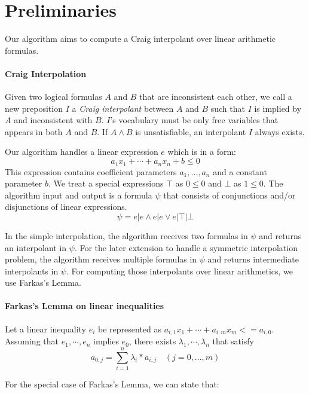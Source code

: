 

\section{Preliminaries}

Our algorithm aims to compute a Craig interpolant over linear
arithmetic formulas.


\paragraph{Craig Interpolation}
Given two logical formulas $A$ and $B$ that are inconsistent each
other, we call a new preposition $I$ a \emph{Craig interpolant}
\cite{journals/jsyml/Craig57} between $A$ and $B$ such that $I$ is
implied by $A$ and inconsistent with $B$.  $I$'s vocabulary must be
only free variables that appears in both $A$ and $B$.  If $A \wedge B$
is unsatisfiable, an interpolant $I$ always exists.

Our algorithm handles a linear expression $e$ which is in a form:
\[ a_1 x_1 + \cdots + a_n x_n + b \leq 0 \]
This expression contains coefficient parameters $a_1, \ldots, a_n$ and
a constant parameter $b$.  We treat a special expressions $\top$ as $0
\leq 0$ and $\bot$ as $1 \leq 0$.  The algorithm input and output is a
formula $\psi$ that consists of conjunctions and/or disjunctions of
linear expressions.
\[ \psi = e | e \wedge e | e \vee e | \top | \bot \]

In the simple interpolation, the algorithm receives two formulas in
$\psi$ and returns an interpolant in $\psi$.  For the later extension
to handle a symmetric interpolation problem, the algorithm receives
multiple formulas in $\psi$ and returns intermediate interpolants in
$\psi$.  For computing those interpolants over linear arithmetics, we
use Farkas's Lemma.


\paragraph{Farkas's Lemma on linear inequalities}
Let a linear inequality $e_i$ be represented as
$a_{i,1} x_1 + \cdots + a_{i,m} x_m <= a_{i,0}$.  Assuming that
$e_1,\cdots,e_n$ implies $e_0$, there exists
$\lambda_1,\cdots,\lambda_n$ that satisfy
\[a_{0,j} = \sum_{i=1}^n \lambda_i * a_{i,j} \quad (j=0, \ldots,m)\]

For the special case of Farkas's Lemma, we can state that:

